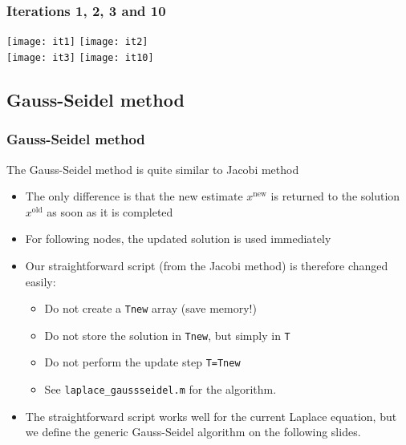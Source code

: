 \begin{frame}[fragile]
  \frametitle{Iterations 1, 2, 3 and 10}
  \texttt{[image: it1]} \hspace{0.5cm}
  \texttt{[image: it2]}\\
  \texttt{[image: it3]} \hspace{0.5cm} \texttt{[image: it10]}
\end{frame}

\subsection*{Gauss-Seidel method}
\begin{frame}[fragile]
  \frametitle{Gauss-Seidel method}
  The Gauss-Seidel method is quite similar to Jacobi method
  \begin{itemize}
   \item The only difference is that the new estimate $x^\text{new}$ is returned to the solution $x^\text{old}$ as soon as it is completed
   \item For following nodes, the updated solution is used immediately \pause
   \item Our straightforward script (from the Jacobi method) is therefore changed easily:
   \begin{itemize}
    \item Do not create a \lstinline$Tnew$ array (save memory!)
    \item Do not store the solution in \lstinline$Tnew$, but simply in \lstinline$T$
    \item Do not perform the update step \lstinline$T=Tnew$
    \item See \lstinline$laplace_gaussseidel.m$ for the algorithm.\pause
   \end{itemize}
   \item The straightforward script works well for the current Laplace equation, but we define the generic Gauss-Seidel algorithm on the following slides.
  \end{itemize}
\end{frame}

